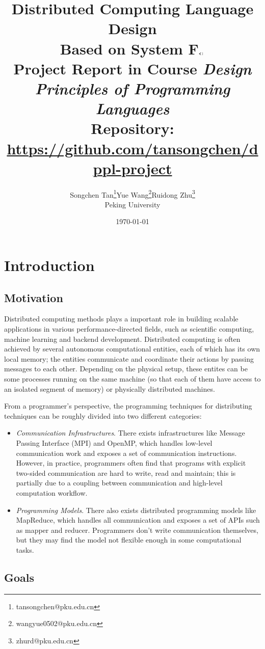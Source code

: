 \documentclass{report}
\title{\Huge Distributed Computing Language Design \\ Based on System F$_{\subty}$ \vspace{1.5em} \\ \Large Project Report in Course \emph{Design Principles of Programming Languages} \vspace{1.5em} \\ Repository: \url{https://github.com/tansongchen/dppl-project}}
\author{Songchen Tan\thanks{tansongchen@pku.edu.cn}\quad Yue Wang\thanks{wangyue0502@pku.edu.cn}\quad Ruidong Zhu\thanks{zhurd@pku.edu.cn} \vspace{1em} \\ Peking University}
\date{\today}
\begin{document}
\maketitle
\tableofcontents

\chapter{Introduction}
\section{Motivation}

Distributed computing methods plays a important role in building scalable applications in various performance-directed fields, such as scientific computing, machine learning and backend development. Distributed computing is often achieved by several autonomous computational entities, each of which has its own local memory; the entities communicate and coordinate their actions by passing messages to each other. Depending on the physical setup, these entites can be some processes running on the same machine (so that each of them have access to an isolated segment of memory) or physically distributed machines.

From a programmer's perspective, the programming techniques for distributing techniques can be roughly divided into two different categories:

\begin{itemize}
  \item \emph{Communication Infrastructures}. There exists infrastructures like Message Passing Interface (MPI)\cite{mpi} and OpenMP\cite{openmp}, which handles low-level communication work and exposes a set of communication instructions. However, in practice, programmers often find that programs with explicit two-sided communication are hard  to write, read and maintain; this is partially due to a coupling between communication and high-level computation workflow.
  \item \emph{Programming Models}. There also exists distributed programming models like MapReduce\cite{mapreduce}, which handles all communication and exposes a set of APIs such as mapper and reducer. Programmers don't write communication themselves, but they may find the model not flexible enough in some computational tasks.
\end{itemize}
\section{Goals}
\end{document}

